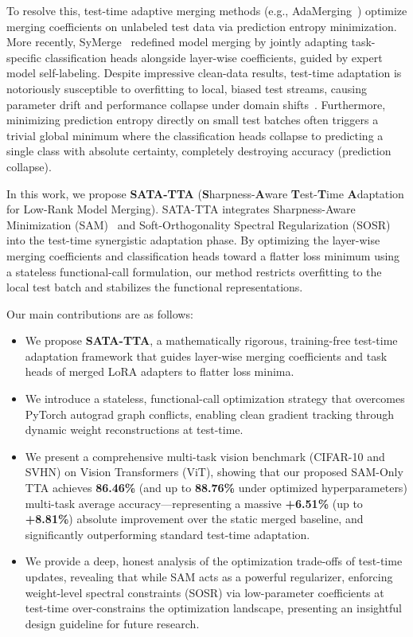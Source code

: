 \documentclass{article}
\theoremstyle{plain}
\theoremstyle{definition}
\theoremstyle{remark}
\begin{document}
To resolve this, test-time adaptive merging methods (e.g., AdaMerging~\cite{yang2024adamerging}) optimize merging coefficients on unlabeled test data via prediction entropy minimization. More recently, SyMerge~\cite{jung2025symerge} redefined model merging by jointly adapting task-specific classification heads alongside layer-wise coefficients, guided by expert model self-labeling. Despite impressive clean-data results, test-time adaptation is notoriously susceptible to overfitting to local, biased test streams, causing parameter drift and performance collapse under domain shifts~\cite{song2023ecotta}. Furthermore, minimizing prediction entropy directly on small test batches often triggers a trivial global minimum where the classification heads collapse to predicting a single class with absolute certainty, completely destroying accuracy (prediction collapse).

In this work, we propose \textbf{SATA-TTA} (\textbf{S}harpness-\textbf{A}ware \textbf{T}est-\textbf{T}ime \textbf{A}daptation for Low-Rank Model Merging). SATA-TTA integrates Sharpness-Aware Minimization (SAM)~\cite{foret2020sharpness} and Soft-Orthogonality Spectral Regularization (SOSR)~\cite{anonymous2026flatter} into the test-time synergistic adaptation phase. By optimizing the layer-wise merging coefficients and classification heads toward a flatter loss minimum using a stateless functional-call formulation, our method restricts overfitting to the local test batch and stabilizes the functional representations.

Our main contributions are as follows:
\begin{itemize}
  \item We propose \textbf{SATA-TTA}, a mathematically rigorous, training-free test-time adaptation framework that guides layer-wise merging coefficients and task heads of merged LoRA adapters to flatter loss minima.
  \item We introduce a stateless, functional-call optimization strategy that overcomes PyTorch autograd graph conflicts, enabling clean gradient tracking through dynamic weight reconstructions at test-time.
  \item We present a comprehensive multi-task vision benchmark (CIFAR-10 and SVHN) on Vision Transformers (ViT), showing that our proposed SAM-Only TTA achieves \textbf{86.46\%} (and up to \textbf{88.76\%} under optimized hyperparameters) multi-task average accuracy—representing a massive \textbf{+6.51\%} (up to \textbf{+8.81\%}) absolute improvement over the static merged baseline, and significantly outperforming standard test-time adaptation.
  \item We provide a deep, honest analysis of the optimization trade-offs of test-time updates, revealing that while SAM acts as a powerful regularizer, enforcing weight-level spectral constraints (SOSR) via low-parameter coefficients at test-time over-constrains the optimization landscape, presenting an insightful design guideline for future research.
\end{itemize}
\end{document}
